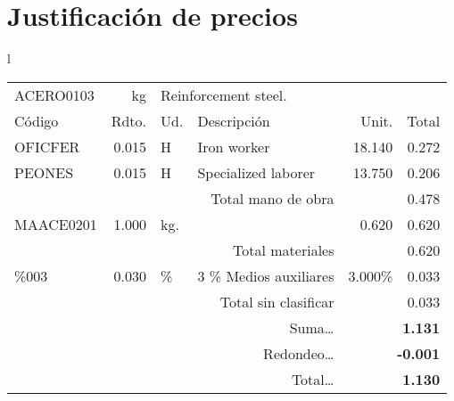 \documentclass{book}%
\begin{document}
%
\normalsize%
\part{Justificación de precios}%
\label{sec:Justificacindeprecios}%
\small%
\begin{longtable}{l}%
\begin{tabular}{l r l p{5cm} r r}%
ACERO0103&kg&\multicolumn{4}{p{8cm}}{Reinforcement steel.}\\%
Código&Rdto.&Ud.&Descripción&Unit.&Total\\%
\hline%
OFICFER&0.015&H&Iron worker&18.140&0.272\\%
PEONES&0.015&H&Specialized laborer&13.750&0.206\\%
\multicolumn{4}{r}{Total mano de obra}&&0.478\\%
MAACE0201&1.000&kg.&&0.620&0.620\\%
\multicolumn{4}{r}{Total materiales}&&0.620\\%
\%003&0.030&\%&3 \% Medios auxiliares&3.000\%&0.033\\%
\multicolumn{4}{r}{Total sin clasificar}&&0.033\\%
\multicolumn{4}{r}{Suma\ldots}&\multicolumn{2}{r}{\textbf{1.131}}\\%
\multicolumn{4}{r}{Redondeo\ldots}&\multicolumn{2}{r}{\textbf{{-}0.001}}\\%
\multicolumn{4}{r}{Total\ldots}&\multicolumn{2}{r}{\textbf{1.130}}\\%
\end{tabular}\\%
\end{longtable}%
\normalsize

%
\end{document}
